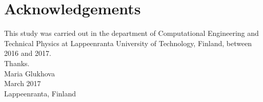 \section*{Acknowledgements}

This study was carried out in the department of Computational Engineering and
Technical Physics at Lappeenranta University of Technology,
Finland, between 2016 and 2017.\\

Thanks.\\

Maria Glukhova\\
March 2017\\
Lappeenranta, Finland\\
